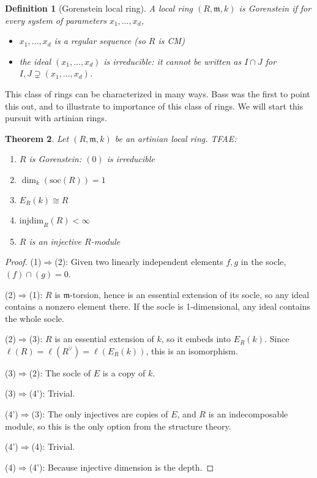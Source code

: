 \documentclass[11pt]{book}
\newtheorem{theorem}{Theorem}[chapter]
\newtheorem{definition}[theorem]{Definition}
\numberwithin{equation}{section}
\numberwithin{theorem}{chapter}
\theoremstyle{definition}
\newtheorem*{basic properties}{Basic Properties}
\newtheorem*{Important Remark}{Important Remark}
\theoremstyle{remark}
\newcommand{\m}{\mathfrak{m}}
\renewcommand{\dim}{\operatorname{dim}}
\begin{document}
\begin{definition}[Gorenstein local ring]
	A local ring $(R,\m,k)$ is \emph{Gorenstein} if for every system of parameters $x_1,\dots,x_d$,
	\begin{itemize}
		\item $x_1,\dots,x_d$ is a regular sequence (so $R$ is CM)
		\item the ideal $(x_1,\dots,x_d)$ is irreducible: it cannot be written as $I\cap J$ for $I,J\supsetneq (x_1,\dots,x_d)$.
	\end{itemize}
\end{definition}

This class of rings can be characterized in many ways. Bass was the first to point this out, and to illustrate to importance of this class of rings. We will start this pursuit with artinian rings.

\begin{theorem}
	Let $(R,\m,k)$ be an artinian local ring. TFAE:
	\begin{enumerate}[1)]
		\item $R$ is Gorenstein: $(0)$ is irreducible
		\item $\dim_k(\mathrm{soc}(R))=1$
		\item $E_R(k)\cong R$
		\item $\mathrm{injdim}_R(R)<\infty$
		\item[4')] $R$ is an injective $R$-module
	\end{enumerate}
\end{theorem}
\begin{proof}
	(1)$\Rightarrow$(2): Given two linearly independent elements $f,g$ in the socle, $(f)\cap (g)=0$.
	
	(2)$\Rightarrow$(1): $R$ is $\m$-torsion, hence is an essential extension of  its socle, so any ideal contains a nonzero element there. If the socle is 1-dimensional, any ideal contains the whole socle.
	
		(2)$\Rightarrow$(3): $R$ is an essential extension of $k$, so it embeds into $E_R(k)$. Since $\ell(R)=\ell(R^\vee)=\ell(E_R(k))$, this is an isomorphism.
	
	(3)$\Rightarrow$(2): The socle of $E$ is a copy of $k$.
	
	
	
	(3)$\Rightarrow$(4'): Trivial.
	
		(4')$\Rightarrow$(3): The only injectives are copies of $E$, and $R$ is an indecomposable module, so this is the only option from the structure theory.
	
	(4')$\Rightarrow$(4): Trivial.
	
		(4)$\Rightarrow$(4'): Because injective dimension is the depth.
\end{proof}
\end{document}
